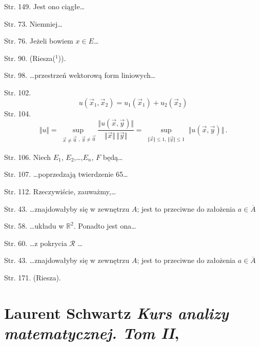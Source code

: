 \documentclass[a4paper,11pt]{article}
\numberwithin{equation}{section}
\begin{document}
\start Str. 149. Jest ono ciągłe\ldots

\start Str. 73. Niemniej\ldots

\start Str. 76. Jeżeli bowiem $x \in E$\ldots

\start Str. 90. \large{(Riesza($^{ 1 }$))}.

\start Str. 98. \ldots przestrzeń wektorową form liniowych\ldots

\start Str. 102.
$$u(\vec{x}_{1},\vec{x}_{2})=u_{1}(\vec{x}_{1})+u_{2}(\vec{x}_{2})$$
\start Str. 104.
$$\Vert u \Vert = \sup_{ \substack{ \vec{ x } \neq \vec{ 0 } },
  \,\vec{ y } \neq \vec{ 0 } } \frac{ \Vert u( \vec x, \vec y ) \Vert
}{ \Vert \vec{ x } \Vert \, \Vert \vec y \Vert } = \sup_{ \substack{
    \Vert \vec{ x } \Vert \leq 1, \, \Vert \vec{ y } \Vert \leq 1 } }
\Vert u( \vec x, \vec y ) \Vert \, .$$

\start Str. 106. Niech $E_{ 1 }$, $E_{ 2 }$,\ldots,$E_{ n }$, $F$
będą\ldots

\start Str. 107. \ldots poprzedzają twierdzenie 65\ldots

\start Str. 112. Rzeczywiście, zauważmy,\ldots

\start Str. 43. \ldots znajdowałyby się w zewnętrzu $A$; jest to
przeciwne do założenia $a \in \overline{ A }$

\start Str. 58. \ldots układu w $\mathbb{R}^{ 2 }$. Ponadto jest
ona\ldots

\start Str. 60. \ldots z pokrycia $\mathcal{R}$ \ldots

\start Str. 43. \ldots znajdowałyby się w zewnętrzu $A$; jest to
przeciwne do założenia $a \in \overline{ A }$


\start Str. 171. \large{(Riesza)}.










\newpage
\section{Laurent Schwartz \textit{Kurs analizy
    matematycznej. Tom II},
  \cite{SchwartzKursAnalizyMatematycznejVolII1980} }





\end{document}

